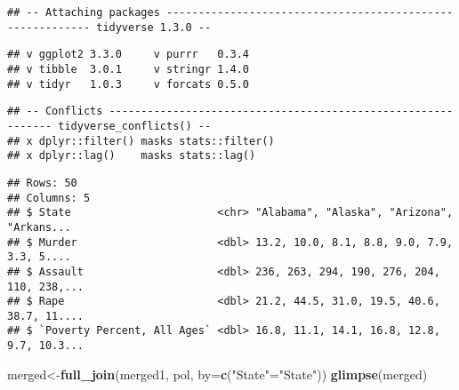 \documentclass[]{article}
\newenvironment{Shaded}{\begin{snugshade}}{\end{snugshade}}
\newcommand{\DataTypeTok}[1]{\textcolor[rgb]{0.13,0.29,0.53}{#1}}
\newcommand{\KeywordTok}[1]{\textcolor[rgb]{0.13,0.29,0.53}{\textbf{#1}}}
\newcommand{\NormalTok}[1]{#1}
\newcommand{\OperatorTok}[1]{\textcolor[rgb]{0.81,0.36,0.00}{\textbf{#1}}}
\newcommand{\StringTok}[1]{\textcolor[rgb]{0.31,0.60,0.02}{#1}}
\begin{document}
\begin{verbatim}
## -- Attaching packages ---------------------------------------------------------- tidyverse 1.3.0 --
\end{verbatim}

\begin{verbatim}
## v ggplot2 3.3.0     v purrr   0.3.4
## v tibble  3.0.1     v stringr 1.4.0
## v tidyr   1.0.3     v forcats 0.5.0
\end{verbatim}

\begin{verbatim}
## -- Conflicts ------------------------------------------------------------- tidyverse_conflicts() --
## x dplyr::filter() masks stats::filter()
## x dplyr::lag()    masks stats::lag()
\end{verbatim}

\begin{Shaded}
\end{Shaded}

\begin{verbatim}
## Rows: 50
## Columns: 5
## $ State                       <chr> "Alabama", "Alaska", "Arizona", "Arkans...
## $ Murder                      <dbl> 13.2, 10.0, 8.1, 8.8, 9.0, 7.9, 3.3, 5....
## $ Assault                     <dbl> 236, 263, 294, 190, 276, 204, 110, 238,...
## $ Rape                        <dbl> 21.2, 44.5, 31.0, 19.5, 40.6, 38.7, 11....
## $ `Poverty Percent, All Ages` <dbl> 16.8, 11.1, 14.1, 16.8, 12.8, 9.7, 10.3...
\end{verbatim}

\begin{Shaded}
\begin{Highlighting}[]
\NormalTok{merged<-}\KeywordTok{full_join}\NormalTok{(merged1, pol, }\DataTypeTok{by=}\KeywordTok{c}\NormalTok{(}\StringTok{"State"}\NormalTok{=}\StringTok{"State"}\NormalTok{))}
\KeywordTok{glimpse}\NormalTok{(merged)}
\end{Highlighting}
\end{Shaded}
\end{document}
